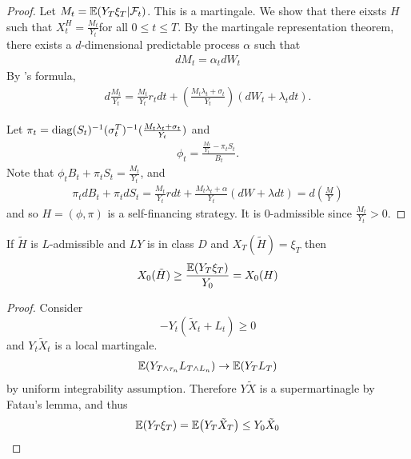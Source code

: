 \begin{proof}
  Let $M_{t} = \E{Y_{T} \xi_{T} | \mathcal{F}_{t}}$.  This is a
  martingale.  We show that there eixsts $H$ such that $X_{t}^{H} =
  \frac{M_{t}}{Y_{t}}$for all $0 \leq t \leq T$.  By the martingale
  representation theorem, there exists a $d$-dimensional predictable
  process $\alpha$ such that
  \begin{align}
    \label{eq:78}
    dM_{t} = \alpha_{t} dW_{t}
  \end{align}  By \ito's formula,
  \begin{align}
    \label{eq:79}
    d \frac{M_{t}}{Y_{t}} = \frac{M_{t}}{Y_{t}} r_{t} dt + (
    \frac{M_{t} \lambda_{t} + \sigma_{t}}{Y_{t}}) (dW_{t} +
    \lambda_{t} dt).
  \end{align}

  Let $\pi_{t} = \operatorname*{diag} (S_{t})^{-1} (\sigma_{t}^{T})^{-1} (\frac{M_{t}
    \lambda_{t} + \sigma_{t}}{Y_{t}})$ and
  \begin{align}
    \label{eq:81}
    \phi_{t} = \frac{\frac{M_{t}}{Y_{t}} - \pi_{t} S_{t}}{B_{t}}.
  \end{align}  Note that $\phi_{t} B_{t} + \pi_{t} S_{t} =
  \frac{M_{t}}{Y_{t}}$, and
  \begin{align}
    \label{eq:82}
    \pi_{t} dB_{t} + \pi_{t} dS_{t} = \frac{M_{t}}{Y_{t}} r dt +
    \frac{M_{t} \lambda_{t} + \alpha}{Y_{t}} (dW  +\lambda dt) = d(\frac{M}{Y})
  \end{align} and so $H = (\phi, \pi)$ is a self-financing strategy.
  It is 0-admissible since $\frac{M_{t}}{Y_{t}} > 0$.
\end{proof}

\begin{thm}
  \label{defn:continuous_time:33}
  If $\tilde H$ is $L$-admissible and $LY$ is in class $D$ and
  $X_{T}(\tilde H) = \xi_{T}$ then
  \begin{align}
    \label{eq:80}
    X_{0}(\tilde H) \geq \frac{\E{Y_{T} \xi_{T}}}{Y_{0}}= X_{0}(H)
  \end{align}
\end{thm}

\begin{proof}
  Consider
  \begin{equation}
    \label{eq:83}
    -Y_{t}(\tilde X_{t} + L_{t}) \geq 0
  \end{equation} and $Y_{t} \tilde X_{t}$ is a local martingale.
  \begin{align}
    \label{eq:84}
    \E{Y_{T \wedge \tau_{n}} L_{T \wedge L_{n}}} \rightarrow \E{Y_{T}
      L_{T}}
  \end{align} by uniform integrability assumption. Therefore $Y \tilde
  X$ is a supermartinagle by Fatau's lemma, and thus
  \begin{align}
    \label{eq:85}
    \E{Y_{T}\xi_{T}} = \E{Y_{T} \tilde X_{T}} \leq Y_{0} \tilde X_{0}
  \end{align}
\end{proof}

